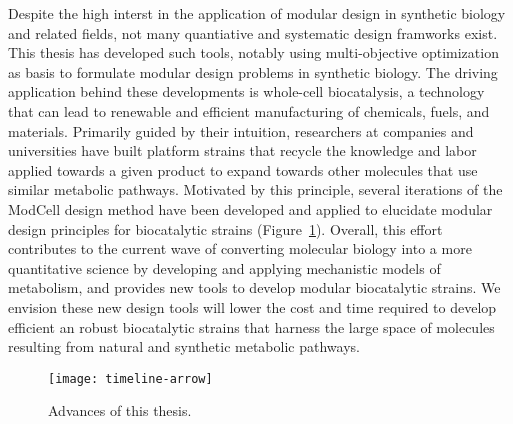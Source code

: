 Despite the high interst in the application of modular design in synthetic biology and related fields,
not many quantiative and systematic design framworks exist.
This thesis has developed such tools, notably using multi-objective optimization as basis to formulate modular design problems in synthetic biology.
The driving application behind these developments is whole-cell biocatalysis, a technology that can lead to renewable and efficient manufacturing of chemicals, fuels, and materials.
Primarily guided by their intuition, researchers at companies and universities have built platform strains that recycle the knowledge and labor applied towards a given product to expand towards other molecules that use similar metabolic pathways. %
Motivated by this principle, several iterations of the ModCell design method have been developed and applied to elucidate modular design principles for biocatalytic strains (Figure~\ref{fig8:arrow}).
Overall, this effort contributes to the current wave of converting molecular biology into a more quantitative science by developing and applying mechanistic models of metabolism, and provides new tools to develop modular biocatalytic strains.
We envision these new design tools will lower the cost and time required to develop efficient an robust biocatalytic strains that harness the large space of molecules resulting from natural and synthetic metabolic pathways.

\begin{figure}[h]
  \centering
  \texttt{[image: timeline-arrow]}
    \caption{Advances of this thesis.}
    \label{fig8:arrow}
\end{figure}


